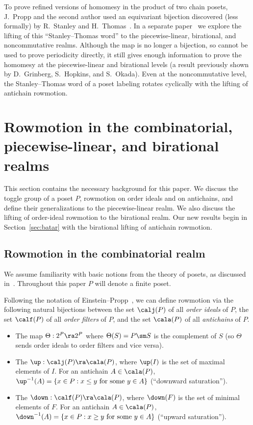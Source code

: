 To prove refined versions of homomesy in the product of two chain posets, J.~Propp and the
second author used an equivariant bijection discovered (less formally) by R.~Stanley and
H.~Thomas~\cite[\S~7]{propproby}. 
In a separate paper~\cite{STword} we explore the lifting of this ``Stanley--Thomas word'' to the
piecewise-linear, birational, and noncommutative realms. Although the map is no longer a
bijection, so cannot be used to prove periodicity directly, it still gives enough
information to prove the homomesy at the piecewise-linear and birational levels (a result
previously shown by D.~Grinberg, S.~Hopkins, and S.~Okada). Even at the noncommutative
level, the Stanley--Thomas word of a poset labeling rotates cyclically with the lifting of
antichain rowmotion.


\section{Rowmotion in the combinatorial, piecewise-linear, and birational realms}\label{sec:jungle rollers}

This section contains the necessary background for this paper.
We discuss the toggle group of a poset $P$, rowmotion on order ideals and on antichains, and
define their
generalizations to the piecewise-linear realm. We also discuss the lifting of order-ideal
rowmotion to the birational realm. 
Our new results begin in Section~\ref{sec:batar} with the birational lifting of
antichain rowmotion.

\subsection{Rowmotion in the combinatorial realm}

We assume familiarity with basic notions from the theory of posets,
as discussed in~\cite[Ch.~3]{ec1ed2}.
Throughout this paper $P$ will denote a finite poset.

Following the notation of Einstein--Propp~\cite{einpropp}, we can define rowmotion via the
following natural bijections between the set $\calj(P)$ of all 
\emph{order ideals} of $P$, the set $\calf(P)$ of all \emph{order filters} of $P$, and the set $\cala(P)$ of
all \emph{antichains} of $P$. 
\begin{itemize}
\item The map $\Theta: 2^P \ra 2^P$ where $\Theta(S) = P\sm S$ is the complement of $S$ (so $\Theta$ sends order ideals to order filters and vice versa).
\item The  $\up:\calj(P) \ra \cala(P)$, where $\up(I)$ is the set of maximal elements of $I$. For an antichain $A\in\cala(P)$,
$\up^{-1}(A)=\{x\in P: x\leq y \text{ for some } y\in A\}$ (``downward saturation'').
\item The  $\down:\calf(P) \ra \cala(P)$, where $\down(F)$ is the set of minimal elements of $F$. For an antichain $A\in\cala(P)$,
$\down^{-1}(A)=\{x\in P: x\geq y \text{ for some } y\in A\}$ (``upward saturation'').
\end{itemize}


